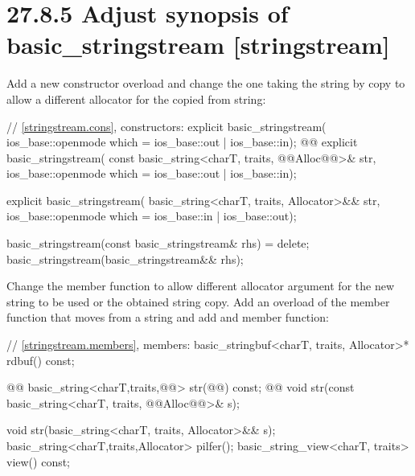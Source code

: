\documentclass[ebook,11pt,article]{memoir}
\begin{document}
\section{27.8.5 Adjust synopsis of basic\_stringstream [stringstream]}
Add a new constructor overload and change the one taking the string by copy to allow a different allocator for the copied from string:
\begin{codeblock}
    // \ref{stringstream.cons}, constructors:
    explicit basic_stringstream(
      ios_base::openmode which = ios_base::out | ios_base::in);
    @@
    explicit basic_stringstream(
      const basic_string<charT, traits, @@Alloc@@>& str,
      ios_base::openmode which = ios_base::out | ios_base::in);
\end{codeblock}
\begin{addedblock}
\begin{codeblock}
    explicit basic_stringstream(
      basic_string<charT, traits, Allocator>&& str,
      ios_base::openmode which = ios_base::in | ios_base::out);
\end{codeblock}
\end{addedblock}
\begin{codeblock}
    basic_stringstream(const basic_stringstream& rhs) = delete;
    basic_stringstream(basic_stringstream&& rhs);
\end{codeblock}

Change the  member function to allow different allocator argument for the new string to be used or the obtained string copy.
Add an overload of the  member function that moves from a string and add  and  member function:

\begin{codeblock}
    // \ref{stringstream.members}, members:
    basic_stringbuf<charT, traits, Allocator>* rdbuf() const;

    @@
    basic_string<charT,traits,@@> str(@@) const;
    @@
    void str(const basic_string<charT, traits, @@Alloc@@>& s);
\end{codeblock}
\begin{addedblock}
\begin{codeblock}
    void str(basic_string<charT, traits, Allocator>&& s);
    basic_string<charT,traits,Allocator> pilfer();
    basic_string_view<charT, traits> view() const;
\end{codeblock}
\end{addedblock}
\end{document}
